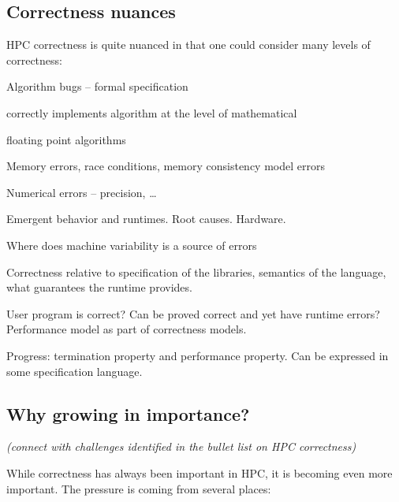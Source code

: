 \subsection{Correctness nuances}

\noindent HPC correctness is quite nuanced in that
one could consider many levels of correctness:

\begin{compactitem}
\item Algorithm bugs – formal specification

  \begin{compactitem}
  \item correctly implements algorithm at the level of mathematical

  \item floating point algorithms
  \end{compactitem}


\item Memory errors, race conditions, memory consistency model errors

\item Numerical errors – precision, …

\item Emergent behavior and runtimes. Root causes. Hardware.

\item Where does machine variability is a source of errors

\item Correctness relative to specification of the libraries, semantics of the language, what guarantees the runtime provides.

\item User program is correct? Can be proved correct and yet have runtime errors? Performance model as part of correctness models.

\item Progress: termination property and performance property. Can be expressed in some specification language. 

\end{compactitem}

\subsection{Why growing in importance?}

{\small\em (connect with challenges identified in the bullet list on HPC correctness)}

\noindent While correctness has always been important in HPC, it is becoming even more important.  The pressure is coming from several places:

